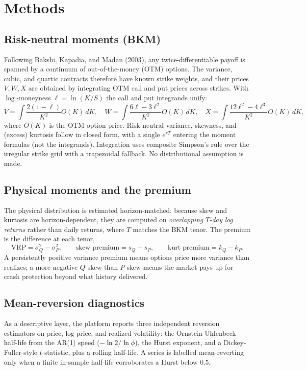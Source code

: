 \documentclass[11pt]{article}
\begin{document}
\section{Methods}

\subsection{Risk-neutral moments (BKM)}
Following Bakshi, Kapadia, and Madan (2003), any twice-differentiable payoff is
spanned by a continuum of out-of-the-money (OTM) options. The variance, cubic, and
quartic contracts therefore have known strike weights, and their prices
$V,W,X$ are obtained by integrating OTM call and put prices across strikes. With
$\log$-moneyness $\ell=\ln(K/S)$ the call and put integrands unify:
\[
V=\!\int\! \frac{2(1-\ell)}{K^2}O(K)\,dK,\quad
W=\!\int\! \frac{6\ell-3\ell^2}{K^2}O(K)\,dK,\quad
X=\!\int\! \frac{12\ell^2-4\ell^3}{K^2}O(K)\,dK,
\]
where $O(K)$ is the OTM option price. Risk-neutral variance, skewness, and
(excess) kurtosis follow in closed form, with a single $e^{rT}$ entering the
moment formulas (not the integrands). Integration uses composite Simpson's rule
over the irregular strike grid with a trapezoidal fallback. No distributional
assumption is made.

\subsection{Physical moments and the premium}
The physical distribution is estimated horizon-matched: because skew and kurtosis
are horizon-dependent, they are computed on \emph{overlapping $T$-day log returns}
rather than daily returns, where $T$ matches the BKM tenor. The premium is the
difference at each tenor,
\[
\text{VRP}=\sigma^2_Q-\sigma^2_P,\qquad
\text{skew premium}=s_Q-s_P,\qquad
\text{kurt premium}=k_Q-k_P .
\]
A persistently positive variance premium means options price more variance than
realizes; a more negative $Q$-skew than $P$-skew means the market pays up for
crash protection beyond what history delivered.

\subsection{Mean-reversion diagnostics}
As a descriptive layer, the platform reports three independent reversion estimators
on price, log-price, and realized volatility: the Ornstein-Uhlenbeck half-life
from the AR(1) speed ($-\ln 2/\ln\phi$), the Hurst exponent, and a
Dickey-Fuller-style $t$-statistic, plus a rolling half-life. A series is labelled
mean-reverting only when a finite in-sample half-life corroborates a Hurst below
$0.5$.
\end{document}
